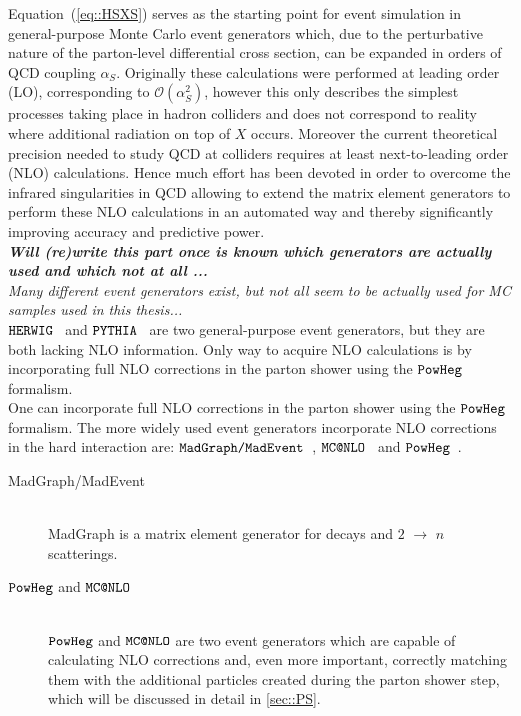 Equation~(\ref{eq::HSXS}) serves as the starting point for event simulation in general-purpose Monte Carlo event generators which, due to the perturbative nature of the parton-level differential cross section, can be expanded in orders of QCD coupling $\alpha_{S}$. Originally these calculations were performed at leading order (LO), corresponding to $\mathcal{O}(\alpha_{S}^{2})$, however this only describes the simplest processes taking place in hadron colliders and does not correspond to reality where additional radiation on top of $X$ occurs. Moreover the current theoretical precision needed to study QCD at colliders requires at least next-to-leading order (NLO) calculations. Hence much effort has been devoted in order to overcome the infrared singularities in QCD allowing to extend the matrix element generators to perform these NLO calculations in an automated way and thereby significantly improving accuracy and predictive power.\\

\textit{\textbf{Will (re)write this part once is known which generators are actually used and which not at all ...\\} Many different event generators exist, but not all seem to be actually used for MC samples used in this thesis...}\\
$\texttt{HERWIG}$~\cite{} and $\texttt{PYTHIA}$~\cite{} are two general-purpose event generators, but they are both lacking NLO information. Only way to acquire NLO calculations is by incorporating full NLO corrections in the parton shower using the $\texttt{PowHeg}$ formalism. \\
One can incorporate full NLO corrections in the parton shower using the $\texttt{PowHeg}$ formalism.
The more widely used event generators incorporate NLO corrections in the hard interaction are: $\texttt{MadGraph/MadEvent}$~\cite{}, $\texttt{MC@NLO}$~\cite{} and $\texttt{PowHeg}$~\cite{}.
\begin{myindentpar}
  \begin{description}
    \item[MadGraph/MadEvent] \hfill \\
      MadGraph is a matrix element generator for decays and $2$ $\rightarrow$ $n$ scatterings. %
    \item[$\texttt{PowHeg}$ and $\texttt{MC@NLO}$] \hfill \\
      $\texttt{PowHeg}$ and $\texttt{MC@NLO}$ are two event generators which are capable of calculating NLO corrections and, even more important, correctly matching them with the additional particles created during the parton shower step, which will be discussed in detail in \ref{sec::PS}.
  \end{description}
\end{myindentpar}

